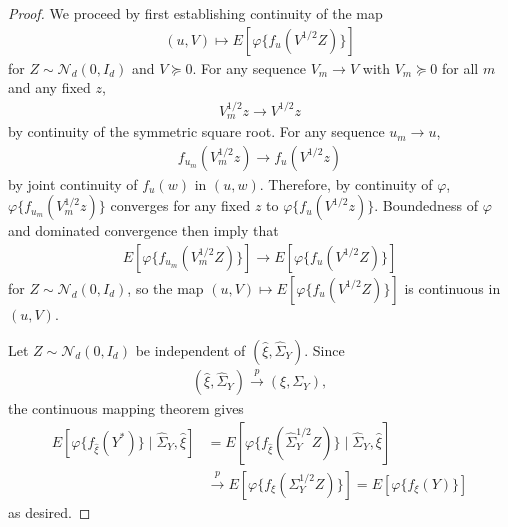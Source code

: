 \documentclass[11pt]{article}
\newcommand{\1}{\mathbbm{1}}
\theoremstyle{plain}
\theoremstyle{definition}
\begin{document}
\begin{proof}
We proceed by first establishing continuity of the map 
\begin{align*} (u, V)\mapsto E[\varphi\{f_{u}(V^{1/2}Z)\}] \end{align*} for $Z\sim \mathcal{N}_d(0, I_d)$ and $V\succeq 0$. For any sequence $V_m\rightarrow V$ with $V_m\succeq 0$ for all $m$ and any fixed $z$, \begin{align*} V_m^{1/2}z\rightarrow V^{1/2} z\end{align*} by continuity of the symmetric square root. For any sequence $u_m\rightarrow u$, \begin{align*}f_{u_m}(V_m^{1/2}z)\rightarrow f_{u}(V^{1/2}z)\end{align*} by joint continuity of $f_u(w)$ in $(u, w)$. Therefore, by continuity of $\varphi$, $\varphi\{f_{u_m}(V_m^{1/2}z)\}$ converges for any fixed $z$ to $\varphi\{f_{u}(V^{1/2}z)\}$. Boundedness of $\varphi$ and dominated convergence then imply that \begin{align*} E[\varphi\{f_{u_m}(V_m^{1/2}Z)\}]\rightarrow E[\varphi\{f_{u}(V^{1/2}Z)\}]\end{align*} for $Z\sim \mathcal{N}_d(0, I_d)$, so the map $(u, V)\mapsto E[\varphi\{f_{u}(V^{1/2}Z)\}]$ is continuous in $(u, V)$. 

Let $Z\sim \mathcal{N}_d(0, I_d)$ be independent of $(\hat{\xi}, \hat{\Sigma}_Y)$. Since 
\begin{align*}(\hat{\xi}, \hat{\Sigma}_Y) \overset{p}{\rightarrow}(\xi, \Sigma_Y),\end{align*} the continuous mapping theorem gives 
\begin{align*}E[\varphi\{f_{\hat{\xi}}(Y^*)\}\mid \hat{\Sigma}_Y, \hat{\xi}] &= E[\varphi\{f_{\hat{\xi}}(\hat{\Sigma}_Y^{1/2}Z)\}\mid \hat{\Sigma}_Y, \hat{\xi}]\\ & \overset{p}{\rightarrow} E[\varphi\{f_{{\xi}}(\Sigma_Y^{1/2}Z)\}] = E[\varphi\{f_{{\xi}}(Y)\}]\end{align*} as desired. 


\end{proof}
\end{document}
